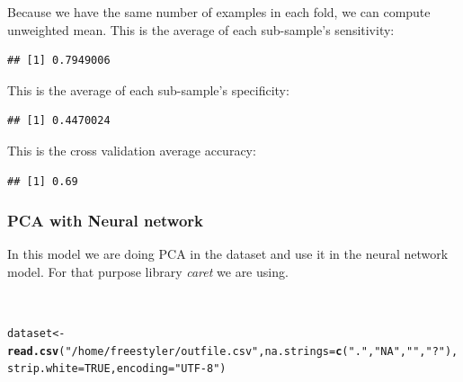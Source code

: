 \documentclass{article}\usepackage[]{graphicx}\usepackage[]{color}
\makeatletter
\newcommand{\hlnum}[1]{\textcolor[rgb]{0.686,0.059,0.569}{#1}}%
\newcommand{\hlstr}[1]{\textcolor[rgb]{0.192,0.494,0.8}{#1}}%
\newcommand{\hlstd}[1]{\textcolor[rgb]{0.345,0.345,0.345}{#1}}%
\newcommand{\hlkwb}[1]{\textcolor[rgb]{0.69,0.353,0.396}{#1}}%
\newcommand{\hlkwc}[1]{\textcolor[rgb]{0.333,0.667,0.333}{#1}}%
\newcommand{\hlkwd}[1]{\textcolor[rgb]{0.737,0.353,0.396}{\textbf{#1}}}%
\newenvironment{kframe}{%
 \def\at@end@of@kframe{}%
 \ifinner\ifhmode%
  \def\at@end@of@kframe{\end{minipage}}%
  \begin{minipage}{\columnwidth}%
 \fi\fi%
 \def\FrameCommand##1{\hskip\@totalleftmargin \hskip-\fboxsep
 \colorbox{shadecolor}{##1}\hskip-\fboxsep
     \hskip-\linewidth \hskip-\@totalleftmargin \hskip\columnwidth}%
 \MakeFramed {\advance\hsize-\width
   \@totalleftmargin\z@ \linewidth\hsize
   \@setminipage}}%
 {\par\unskip\endMakeFramed%
 \at@end@of@kframe}
\newenvironment{knitrout}{}{} %
\makeatother
\begin{document}
Because we have the same number of examples in each fold, we can compute unweighted mean. This is the average of each sub-sample's sensitivity:
\begin{knitrout}
\color{fgcolor}\begin{kframe}
\begin{verbatim}
## [1] 0.7949006
\end{verbatim}
\end{kframe}
\end{knitrout}
This is the average of each sub-sample's specificity:
\begin{knitrout}
\color{fgcolor}\begin{kframe}
\begin{verbatim}
## [1] 0.4470024
\end{verbatim}
\end{kframe}
\end{knitrout}
This is the cross validation average accuracy:
\begin{knitrout}
\color{fgcolor}\begin{kframe}
\begin{verbatim}
## [1] 0.69
\end{verbatim}
\end{kframe}
\end{knitrout}

\subsubsection{PCA with Neural network} In this model we are doing PCA in the dataset and use it in the neural network model. For that purpose library \textit{caret} we are using.\par\\ 


\begin{knitrout}
\color{fgcolor}\begin{kframe}
\begin{alltt}
\hlstd{dataset} \hlkwb{<-} \hlkwd{read.csv}\hlstd{(}\hlstr{"/home/freestyler/outfile.csv"}\hlstd{,} \hlkwc{na.strings}\hlstd{=}\hlkwd{c}\hlstd{(}\hlstr{"."}\hlstd{,} \hlstr{"NA"}\hlstd{,} \hlstr{""}\hlstd{,} \hlstr{"?"}\hlstd{),} \hlkwc{strip.white}\hlstd{=}\hlnum{TRUE}\hlstd{,} \hlkwc{encoding}\hlstd{=}\hlstr{"UTF-8"}\hlstd{)}
\end{alltt}
\end{kframe}
\end{knitrout}
\end{document}
